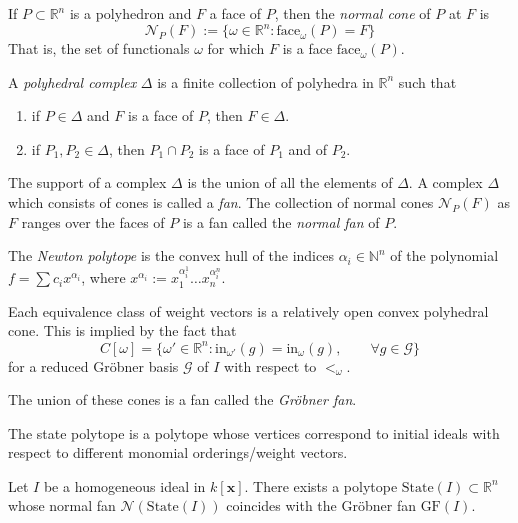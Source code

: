 If $P\subset \mathbb{R}^n$ is a polyhedron and $F$ a face of $P$, then the 
{\it normal cone}  of $P$ at $F$ is
$$
\mathcal{N}_P(F):=\{\omega \in \mathbb{R}^n:\text{face}_\omega(P)=F\}
$$
That is, the set of functionals $\omega$ for which $F$ is a face
$\text{face}_\omega(P)$.

A {\it polyhedral complex} $\Delta$ is a finite collection of polyhedra in
$\mathbb{R}^n$ such that
\begin{enumerate}
\item if $P \in \Delta$ and $F$ is a face of $P$, then $F \in \Delta$.
\item if $P_1,P_2\in\Delta$, then $P_1\cap P_2$ is a face of $P_1$ and of $P_2$.
\end{enumerate}
The support of a complex $\Delta$ is the union of all the elements of $\Delta$.
A complex $\Delta$ which consists of cones is called a {\it fan}. The collection
of normal cones $\mathcal{N}_P(F)$ as $F$ ranges over the faces of $P$ is a fan
called the {\it normal fan} of $P$.

The {\it Newton polytope} is the convex hull
of the indices $\alpha_i \in \mathbb{N}^n$ of the polynomial 
$f=\sum c_ix^{\alpha_i}$, where 
$x^{\alpha_i}:=x_1^{\alpha_i^1}\ldots x_n^{\alpha_i^n}$.

\begin{proposition}
\label{proposition-equivalence-classes-of-weight-vectors}
\begin{reference}
\cite[Proposition 2.3]{sturmfelds-groebner}
\end{reference}
Each equivalence class of weight vectors is a relatively open convex polyhedral
cone. This is implied by the fact that
$$
C[\omega]=\{\omega'\in \mathbb{R}^n:
\text{in}_{\omega'}(g)=\text{in}_\omega(g),\qquad \forall g \in \mathcal{G}\}
$$
for a reduced Gröbner basis $\mathcal{G}$ of $I$ with respect to $<_\omega$.
\end{proposition}

The union of these cones is a fan called the {\it Gröbner fan}.

The state polytope is a polytope whose vertices correspond to
initial ideals with respect to different monomial orderings/weight vectors.

\begin{theorem}
\label{theorem-groebner-fan-and-state-polytope}
\begin{reference}
\cite[Theorem 2.2]{sturmfelds-groebner}
\end{reference}
Let $I$ be a homogeneous ideal in $k[\mathbf{x}]$. There exists a polytope
$\text{State}(I) \subset \mathbb{R}^n$ whose normal fan
$\mathcal{N}(\text{State}(I))$ coincides with the Gröbner fan $\text{GF}(I)$.
\end{theorem}

